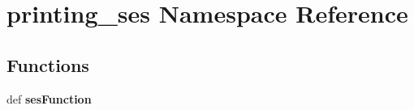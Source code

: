 \section{printing\_\-ses Namespace Reference}
\label{namespaceprinting__ses}


\subsection*{Functions}
\begin{CompactItemize}
\item 
def {\bf ses\-Function}\label{namespaceprinting__ses_60a0ad4bc295cf4d5293bed58ceee599}

\end{CompactItemize}
